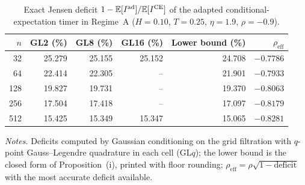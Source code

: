 \begin{table}[!htb]
\centering
\caption{Exact Jensen deficit $1-\mathbb{E}[I^{\mathrm{ad}}]/\mathbb{E}[I^{\mathrm{CE}}]$ of the adapted conditional-expectation timer in Regime~A ($H=0.10$, $T=0.25$, $\eta=1.9$, $\rho=-0.9$).}
\label{tab:s_jensen_deficit}
\footnotesize
\begin{tabular}{@{}rrrrrr@{}}
\toprule
$n$ & GL2 (\%) & GL8 (\%) & GL16 (\%) & Lower bound (\%) & $\rho_{\mathrm{eff}}$ \\
\midrule
32 & 25.279 & 25.155 & 25.152 & 24.708 & $-0.7786$ \\
64 & 22.414 & 22.305 & -- & 21.901 & $-0.7933$ \\
128 & 19.827 & 19.731 & -- & 19.370 & $-0.8063$ \\
256 & 17.504 & 17.418 & -- & 17.097 & $-0.8179$ \\
512 & 15.425 & 15.349 & 15.347 & 15.065 & $-0.8281$ \\
\bottomrule
\end{tabular}
\par\smallskip
\parbox{\linewidth}{\footnotesize\emph{Notes.} Deficits computed by Gaussian conditioning on the grid filtration with $q$-point Gauss--Legendre quadrature in each cell (GL$q$); the lower bound is the closed form of Proposition~(i), printed with floor rounding; $\rho_{\mathrm{eff}}=\rho\sqrt{1-\text{deficit}}$ with the most accurate deficit available.}
\end{table}
